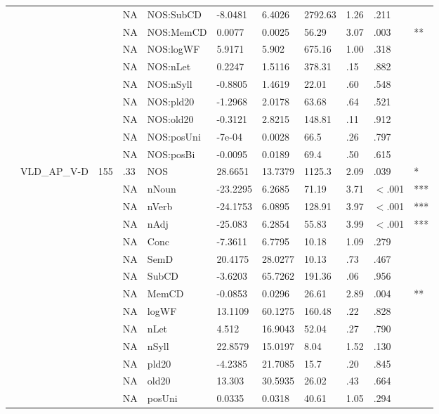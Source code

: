 \begin{table}[ht]
\begin{tabular}{lllllllllll}
   &  &  & NA & NOS:SubCD & -8.0481 & 6.4026 & 2792.63 & 1.26 & .211 &   \\ 
   &  &  & NA & NOS:MemCD & 0.0077 & 0.0025 & 56.29 & 3.07 & .003 & ** \\ 
   &  &  & NA & NOS:logWF & 5.9171 & 5.902 & 675.16 & 1.00 & .318 &   \\ 
   &  &  & NA & NOS:nLet & 0.2247 & 1.5116 & 378.31 & .15 & .882 &   \\ 
   &  &  & NA & NOS:nSyll & -0.8805 & 1.4619 & 22.01 & .60 & .548 &   \\ 
   &  &  & NA & NOS:pld20 & -1.2968 & 2.0178 & 63.68 & .64 & .521 &   \\ 
   &  &  & NA & NOS:old20 & -0.3121 & 2.8215 & 148.81 & .11 & .912 &   \\ 
   &  &  & NA & NOS:posUni & -7e-04 & 0.0028 & 66.5 & .26 & .797 &   \\ 
   &  &  & NA & NOS:posBi & -0.0095 & 0.0189 & 69.4 & .50 & .615 &   \\ 
   & VLD\_AP\_V-D & 155 & .33 & NOS & 28.6651 & 13.7379 & 1125.3 & 2.09 & .039 & * \\ 
   &  &  & NA & nNoun & -23.2295 & 6.2685 & 71.19 & 3.71 & $<$.001 & *** \\ 
   &  &  & NA & nVerb & -24.1753 & 6.0895 & 128.91 & 3.97 & $<$.001 & *** \\ 
   &  &  & NA & nAdj & -25.083 & 6.2854 & 55.83 & 3.99 & $<$.001 & *** \\ 
   &  &  & NA & Conc & -7.3611 & 6.7795 & 10.18 & 1.09 & .279 &   \\ 
   &  &  & NA & SemD & 20.4175 & 28.0277 & 10.13 & .73 & .467 &   \\ 
   &  &  & NA & SubCD & -3.6203 & 65.7262 & 191.36 & .06 & .956 &   \\ 
   &  &  & NA & MemCD & -0.0853 & 0.0296 & 26.61 & 2.89 & .004 & ** \\ 
   &  &  & NA & logWF & 13.1109 & 60.1275 & 160.48 & .22 & .828 &   \\ 
   &  &  & NA & nLet & 4.512 & 16.9043 & 52.04 & .27 & .790 &   \\ 
   &  &  & NA & nSyll & 22.8579 & 15.0197 & 8.04 & 1.52 & .130 &   \\ 
   &  &  & NA & pld20 & -4.2385 & 21.7085 & 15.7 & .20 & .845 &   \\ 
   &  &  & NA & old20 & 13.303 & 30.5935 & 26.02 & .43 & .664 &   \\ 
   &  &  & NA & posUni & 0.0335 & 0.0318 & 40.61 & 1.05 & .294 &   \\ 

\end{tabular}
\end{table}
